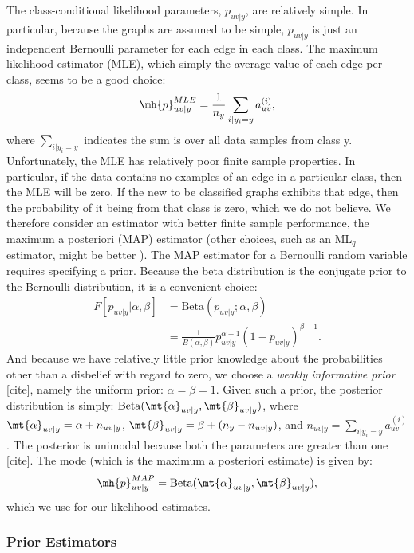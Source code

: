 \documentclass[10pt,journal,cspaper,compsoc]{IEEEtran}
\begin{document}
The class-conditional likelihood parameters, $p_{uv|y}$, are relatively simple.  In particular, because the graphs are assumed to be simple, $p_{uv|y}$ is just an independent Bernoulli parameter for each edge in each class.  The maximum likelihood estimator (MLE), which simply the average value of each edge per class, seems to be a good choice:
\begin{align}
\mh{p}_{uv|y}^{MLE} = \frac{1}{n_y} \sum_{i | y_i = y} a_{uv}^{(i)},
\end{align}
where $\sum_{i | y_i=y}$ indicates the sum is over all data samples from class y. Unfortunately, the MLE has relatively poor finite sample properties.  In particular, if the data contains no examples of an edge in a particular class, then the MLE will be zero.  If the new to be classified graphs exhibits that edge, then the probability of it being from that class is zero, which we do not believe.  We therefore consider an estimator with better finite sample performance, the maximum a posteriori (MAP) estimator (other choices, such as an ML$_q$ estimator, might be better \cite{}).  The MAP estimator for a Bernoulli random variable requires specifying a prior.  Because the beta distribution is the conjugate prior to the Bernoulli distribution, it is a convenient choice: 
\begin{align}
F[ p_{uv|y} | \alpha, \beta] &= \text{Beta}(p_{uv|y}; \alpha,\beta)
\nonumber \\ &= \frac{1}{B(\alpha,\beta)}p_{uv|y}^{\alpha-1}(1-p_{uv|y})^{\beta-1}.
\end{align}
And because we have relatively little prior knowledge about the probabilities other than a disbelief with regard to zero, we choose a \emph{weakly informative prior} [cite], namely the uniform prior: $\alpha=\beta=1$. Given such a prior, the posterior distribution is simply: $\text{Beta}(\mt{\alpha}_{uv|y},\mt{\beta}_{uv|y})$, where $\mt{\alpha}_{uv|y}=\alpha+n_{uv|y}$, $\mt{\beta}_{uv|y}=\beta+(n_y-n_{uv|y})$, and $n_{uv|y}=\sum_{i | y_i = y} a_{uv}^{(i)}$.  The posterior is unimodal because both the parameters are greater than one [cite].  The mode (which is the maximum a posteriori estimate) is given by:
\begin{align}
\mh{p}_{uv|y}^{MAP} = \text{Beta}(\mt{\alpha}_{uv|y},\mt{\beta}_{uv|y}),
\end{align}
which we use for our likelihood estimates.



\subsubsection{Prior Estimators} %
\label{sub:prior_estimators}
\end{document}
